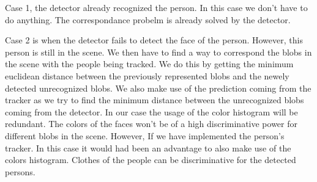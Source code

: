 Case 1, the detector already recognized the person. In this case we don't have to do anything. The correspondance probelm is already solved by the detector.

Case 2 is when the detector fails to detect the face of the person. However, this person is still in the scene. We then have to find a way to correspond the blobs in the scene with the people being tracked. We do this by getting the minimum euclidean distance between the previously represented blobs and the newely detected unrecognized blobs. We also make use of the prediction coming from the tracker as we try to find the minimum distance between the unrecognized blobs coming from the detector. In our case the usage of the color histogram will be redundant. The colors of the faces won't be of a high discriminative power for different blobs in the scene. However, If we have implemented the person's tracker. In this case it would had been an advantage to also make use of the colors histogram. Clothes of the people can be discriminative for the detected persons.
